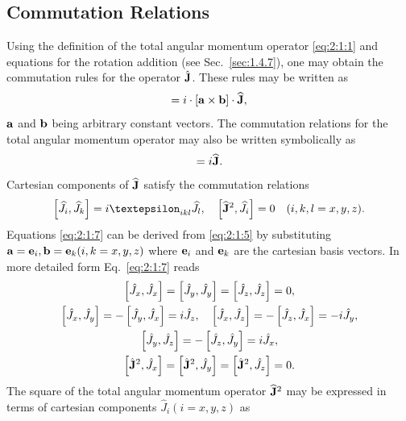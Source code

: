 \subsection{Commutation Relations}
Using the definition of the total angular momentum operator \eqref{eq:2:1:1} and equations for the rotation addition (see Sec.~\ref{sec:1.4.7}), one may obtain the commutation rules for the operator $\hat{\mathbf{J}}$. These rules may be written as
\begin{equation}
[(\vect{a} \cdot \widehat{\vect{J}}),(\vect{b} \cdot \widehat{\vect{J}})]=i \cdot[\vect{a} \times \vect{b}] \cdot \widehat{\vect{J}}, \label{eq:2:1:5}
\end{equation}
$\mathbf{a}$ and $\mathbf{b}$ being arbitrary constant vectors. The commutation relations for the total angular momentum operator may also be written symbolically as
\begin{equation}
[\widehat{\vect{J}} \times \widehat{\vect{J}}]=i \widehat{\vect{J}} .\label{eq:2:1:6}
\end{equation}
Cartesian components of $\widehat{\mathbf{J}}$ satisfy the commutation relations
\begin{equation}
\left[\widehat{J}_{i}, \widehat{J}_{k}\right]=i \varepsilon_{i k l} \widehat{J}_{l}, \quad\left[\widehat{\vect{J}}^{2}, \widehat{J}_{i}\right]=0 \quad(i, k, l=x, y, z). \label{eq:2:1:7}
\end{equation}
Equations \eqref{eq:2:1:7} can be derived from \eqref{eq:2:1:5} by substituting $\mathbf{a}=\mathbf{e}_{i}, \mathbf{b}=\mathbf{e}_{k}(i, k=x, y, z)$ where $\mathbf{e}_{i}$ and $\mathbf{e}_{k}$ are the cartesian basis vectors. In more detailed form Eq.~\eqref{eq:2:1:7} reads
\begin{gather}
{\left[\hat{J}_{x}, \hat{J}_{x}\right]=\left[\hat{J}_{y}, \hat{J}_{y}\right]=\left[\hat{J}_{z}, \hat{J}_{z}\right]=0} , \notag\\
{\left[\hat{J}_{x}, \hat{J}_{y}\right]=-\left[\hat{J}_{y}, \hat{J}_{x}\right]=i \hat{J}_{z}, \quad\left[\hat{J}_{x}, \hat{J}_{z}\right]=-\left[\hat{J}_{z}, \hat{J}_{x}\right]=-i \hat{J}_{y}} , \notag\\
{\left[\hat{J}_{y}, \hat{J}_{z}\right]=-\left[\hat{J}_{z}, \hat{J}_{y}\right]=i \hat{J}_{x}}  ,\label{eq:2:1:8}\\
{\left[\hat{\mathbf{J}}^{2}, \hat{J}_{x}\right]=\left[\hat{\mathbf{J}}^{2}, \hat{J}_{y}\right]=\left[\hat{\mathbf{J}}^{2}, \hat{J}_{z}\right]=0} .\notag
\end{gather}
The square of the total angular momentum operator $\widehat{\mathbf{J}}^{2}$ may be expressed in terms of cartesian components $\widehat{J}_{i}(i=x, y, z)$ as
